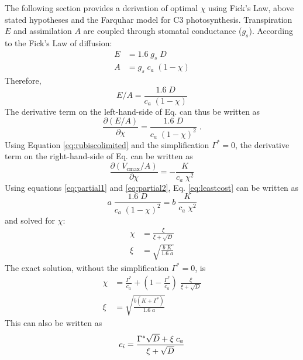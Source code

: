 \documentclass{myreport}
\begin{document}
The following section provides a derivation of optimal $\chi$ using Fick's Law, above stated hypotheses and the Farquhar model for C3 photosynthesis. 
Transpiration $E$ and assimilation $A$ are coupled through stomatal conductance ($g_s$).
According to the Fick's Law of diffusion:
\begin{align}
\label{eq:fick}
    E &= 1.6 \; g_s \; D \\
    A &= g_s \; c_a \; (1-\chi)
\end{align}
Therefore,
\begin{equation}
    E/A = \frac{1.6 \; D}{c_a\;(1-\chi)}
\end{equation}
The derivative term on the left-hand-side of Eq.\label{eq:leastcost} can thus be written as
\begin{equation}
\label{eq:partial1}
    \frac{\partial (E/A)}{\partial \chi} = \frac{1.6\;D}{c_a\;(1-\chi)^2}\;.
\end{equation}
Using Equation \ref{eq:rubiscolimited} and the simplification $\Gamma^{\ast}=0$, the derivative term on the right-hand-side of Eq.\label{eq:leastcost} can be written as
\begin{equation}
\label{eq:partial2}
    \frac{\partial (V_{\mathrm{cmax}}/A)}{\partial \chi} = - \frac{K}{c_a\;\chi^2}
\end{equation}
Using equations \ref{eq:partial1} and \ref{eq:partial2}, Eq. \ref{eq:leastcost} can be written as
\begin{equation}
    a\;\frac{1.6\;D}{c_a\;(1-\chi)^2} = b\;\frac{K}{c_a\;\chi^2}
\end{equation}
and solved for $\chi$:
\begin{align}
    \chi &= \frac{\xi}{\xi + \sqrt{D}} \\ 
    \xi &= \sqrt{\frac{b\;K}{1.6\;a}}
\end{align}
The exact solution, without the simplification $\Gamma^{\ast}=0$, is 
\begin{align}
\label{eq:chi_exact}
    \chi &= \frac{\Gamma^{\ast}}{c_a} + \left(1- \frac{\Gamma^{\ast}}{c_a}\right)\;\frac{\xi}{\xi + \sqrt{D}}\\
    \xi &= \sqrt{\frac{b(K+\Gamma^{\ast})}{1.6\;a}}
\end{align}
This can also be written as
\begin{equation}
\label{eq:ci}
    c_i = \frac{\Gamma^{\ast}\sqrt{D}+ \xi\;c_a}{\xi + \sqrt{D}} \\ 
\end{equation}
\clearpage
\end{document}

